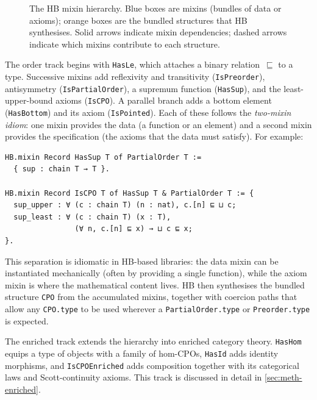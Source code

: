 \begin{figure}[ht]
\caption{The HB mixin hierarchy.  Blue boxes are mixins (bundles of data
  or axioms); orange boxes are the bundled structures that HB synthesises.
  Solid arrows indicate mixin dependencies; dashed arrows indicate which
  mixins contribute to each structure.}
\label{fig:mixin-hierarchy}
\end{figure}

The order track begins with \texttt{HasLe}, which attaches a binary
relation~$\sqsubseteq$ to a type.  Successive mixins add reflexivity
and transitivity (\texttt{IsPreorder}), antisymmetry
(\texttt{IsPartialOrder}), a supremum function (\texttt{HasSup}), and the
least-upper-bound axioms (\texttt{IsCPO}).  A parallel branch adds a
bottom element (\texttt{HasBottom}) and its axiom (\texttt{IsPointed}).
Each of these follows the \emph{two-mixin idiom}: one mixin provides the
data (a function or an element) and a second mixin provides the
specification (the axioms that the data must satisfy).  For example:

\begin{lstlisting}[caption={The two-mixin idiom for $\omega$-CPOs.},
                    label={lst:iscpo}]
HB.mixin Record HasSup T of PartialOrder T :=
  { sup : chain T → T }.

HB.mixin Record IsCPO T of HasSup T & PartialOrder T := {
  sup_upper : ∀ (c : chain T) (n : nat), c.[n] ⊑ ⊔ c;
  sup_least : ∀ (c : chain T) (x : T),
                (∀ n, c.[n] ⊑ x) → ⊔ c ⊑ x;
}.
\end{lstlisting}

\noindent
This separation is idiomatic in HB-based libraries: the data mixin can
be instantiated mechanically (often by providing a single function), while
the axiom mixin is where the mathematical content lives.  HB then
synthesises the bundled structure \texttt{CPO} from the accumulated mixins,
together with coercion paths that allow any \texttt{CPO.type} to be used
wherever a \texttt{PartialOrder.type} or \texttt{Preorder.type} is expected.

The enriched track extends the hierarchy into enriched category theory.
\texttt{HasHom} equips a type of objects with a family of hom-CPOs,
\texttt{HasId} adds identity morphisms, and \texttt{IsCPOEnriched} adds
composition together with its categorical laws and Scott-continuity axioms.
This track is discussed in detail in \cref{sec:meth-enriched}.

